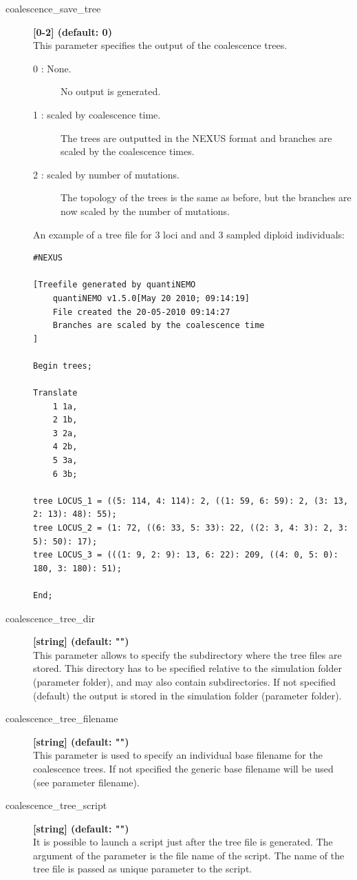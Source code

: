 \documentclass[letterpaper,12pt,oneside]{book}
\begin{document}
\begin{description} 
\item[coalescence\_save\_tree] \textbf{[0-2] (default: 0)} \\
This parameter specifies the output of the coalescence trees.
\begin{description}
\item [0 : None.] No output is generated.
\item [1 : scaled by coalescence time.] The trees are outputted in the NEXUS format and branches are scaled by the coalescence times.
\item [2 : scaled by number of mutations.] The topology of the trees is the same as before, but the branches are now scaled by the number of mutations.
\end{description} 

An example of a tree file for 3 loci and and 3 sampled diploid individuals:
\begin{lstlisting}[frame=single]
#NEXUS

[Treefile generated by quantiNEMO
    quantiNEMO v1.5.0[May 20 2010; 09:14:19]
    File created the 20-05-2010 09:14:27
    Branches are scaled by the coalescence time
]

Begin trees;

Translate
    1 1a,
    2 1b,
    3 2a,
    4 2b,
    5 3a,
    6 3b;

tree LOCUS_1 = ((5: 114, 4: 114): 2, ((1: 59, 6: 59): 2, (3: 13, 2: 13): 48): 55);
tree LOCUS_2 = (1: 72, ((6: 33, 5: 33): 22, ((2: 3, 4: 3): 2, 3: 5): 50): 17);
tree LOCUS_3 = (((1: 9, 2: 9): 13, 6: 22): 209, ((4: 0, 5: 0): 180, 3: 180): 51);

End;
\end{lstlisting}

\item[coalescence\_tree\_dir] \textbf{[string] (default: "")}\\
This parameter allows to specify the subdirectory where the tree files are stored. This directory has to be specified relative to the simulation folder (parameter \textsf{folder}), and may also contain subdirectories. If not specified (default) the output is stored in the simulation folder (parameter \textsf{folder}).

\item[coalescence\_tree\_filename] \textbf{[string] (default: "")}\\
This parameter is used to specify an individual base filename for the coalescence trees. If not specified the generic base filename will be used (see parameter \textsf{filename}).


\item[coalescence\_tree\_script] \textbf{[string] (default: "")}\\
It is possible to launch a script just after the tree file is generated. The argument of the parameter is the file name of the script. The name of the tree file is passed as unique parameter to the script. 
\end{description}
\end{document}
